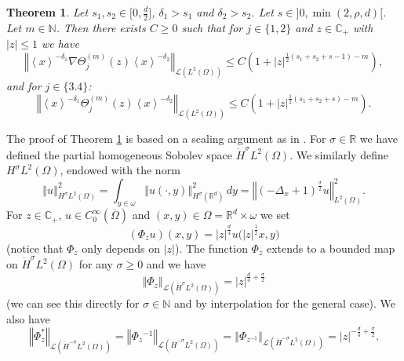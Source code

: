 \documentclass[10pt, a4paper,reqno]{amsart}
\theoremstyle{plain}
\newtheorem{theorem}{{Theorem}}[section]
\theoremstyle{definition}
\theoremstyle{remark}
\begin{document}
\begin{theorem} \label{th-low-freq}
Let $s_1,s_2 \in \big[0,\frac d 2\big]$, ${\delta}_1 > s_1$ and ${\delta}_2 > s_2$. Let $s \in ]0,\min(2,\rho,d)[$. Let $m \in {\mathbb{N}}$. Then there exists $C {\geqslant} 0$ such that for $j \in \{1,2\}$ and $z \in {\mathbb{C}}_+$ with ${\left\vert z\right\vert} {\leqslant} 1$ we have 
\begin{equation} \label{estim-Th12}
{\left\Vert {{\left< x \right>}^{-{\delta}_1} \nabla {\Theta}_j^{(m)}(z) {\left< x \right>}^{-{\delta}_2}}\right\Vert}_{{{\mathcal L}}(L^{2}({\Omega}))} {\leqslant} C \left( 1 + {\left\vert z\right\vert}^{\frac 12 (s_1 + s_2 + s -1) - m }\right),
\end{equation} 
and for $j \in \{3.4\}$:
\begin{equation} \label{estim-Th34}
{\left\Vert {{\left< x \right>}^{-{\delta}_1} {\Theta}_j^{(m)}(z) {\left< x \right>}^{-{\delta}_2}}\right\Vert}_{{{\mathcal L}}(L^{2}({\Omega}))} {\leqslant} C \left( 1 + {\left\vert z\right\vert}^{\frac 12 (s_1 + s_2 + s) - m }\right).
\end{equation}
\end{theorem}

The proof of Theorem \ref{th-low-freq} is based on a scaling argument as in \cite{bouclet11,boucletr14,royer-dld-energy-space}.
For ${\sigma} \in {\mathbb{R}}$ we have defined the partial homogeneous Sobolev space $\dot H^{\sigma} L^2({\Omega})$. We similarly define $H^{\sigma} L^2({\Omega})$, endowed with the norm 
\[
{\left\Vert {u}\right\Vert}_{H^{\sigma} L^2({\Omega})}^2 = \int_{y \in {\omega}} {\left\Vert {u(\cdot,y)}\right\Vert}_{H^{\sigma}({\mathbb{R}}^d)}^2 \, dy = {\left\Vert {(-{{\Delta}_x} + 1)^{\frac {\sigma} 2} u}\right\Vert}_{L^2({\Omega})}^2.
\]
For $z \in {\mathbb{C}}_+$, $u \in C_0^\infty({\overline{\Omega}})$ and $(x,y) \in {\Omega} = {\mathbb{R}}^d \times {\omega}$ we set 
\[
(\Phi_z u)(x,y) = {\left\vert {z}\right\vert}^{\frac d 4} u \big( {\left\vert z\right\vert}^{\frac 12} x, y \big)
\]
(notice that $\Phi_z$ only depends on ${\left\vert z\right\vert}$). The function $\Phi_z$ extends to a bounded map on $\dot H^{\sigma} L^2({\Omega})$ for any ${\sigma} {\geqslant} 0$ and we have
\begin{equation} \label{nr-Phiz-1}
{\left\Vert {\Phi_z}\right\Vert}_{{{\mathcal L}}(\dot H^{\sigma} L^2({\Omega}))} = {\left\vert {z}\right\vert}^{\frac d 4 + \frac {\sigma} 2}
\end{equation}
(we can see this directly for ${\sigma} \in {\mathbb{N}}$ and by interpolation for the general case). We also have 
\begin{equation} \label{nr-Phiz-2}
{\left\Vert {\Phi_z^*}\right\Vert}_{{{\mathcal L}}(\dot H^{-{\sigma}} L^2({\Omega}))} = {\left\Vert {\Phi_z{^{-1}}}\right\Vert}_{{{\mathcal L}}(\dot H^{-{\sigma}} L^2({\Omega}))} = {\left\Vert {\Phi_{z{^{-1}}}}\right\Vert}_{{{\mathcal L}}(\dot H^{-{\sigma}} L^2({\Omega}))} = {\left\vert {z}\right\vert}^{-\frac d 4 + \frac {\sigma} 2}.
\end{equation}
\end{document}
